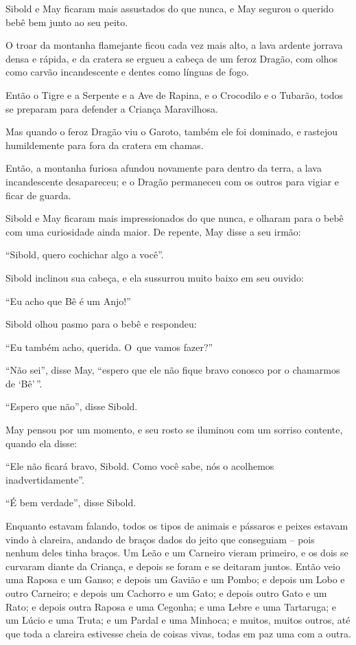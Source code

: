 Sibold e May ficaram mais assustados do que nunca, e May segurou o
querido bebê bem junto ao seu peito.

O troar da montanha flamejante ficou cada vez mais alto, a lava ardente
jorrava densa e rápida, e da cratera se ergueu a cabeça de um feroz
Dragão, com olhos como carvão incandescente e dentes como línguas de
fogo.

Então o Tigre e a Serpente e a Ave de Rapina, e o Crocodilo e o Tubarão,
todos se preparam para defender a Criança Maravilhosa.

Mas quando o feroz Dragão viu o Garoto, também ele foi dominado, e
rastejou humildemente para fora da cratera em chamas.

Então, a montanha furiosa afundou novamente para dentro da terra, a lava
incandescente desapareceu; e o Dragão permaneceu com os outros para
vigiar e ficar de guarda.

Sibold e May ficaram mais impressionados do que nunca, e olharam para o
bebê com uma curiosidade ainda maior. De repente, May disse a seu irmão:

``Sibold, quero cochichar algo a você''.

Sibold inclinou sua cabeça, e ela sussurrou muito baixo em seu ouvido:

``Eu acho que Bê é um Anjo!''

Sibold olhou pasmo para o bebê e respondeu:

``Eu também acho, querida. O~que vamos fazer?''

``Não sei'', disse May, ``espero que ele não fique bravo conosco por o
chamarmos de `Bê'\,''.

``Espero que não'', disse Sibold.

May pensou por um momento, e seu rosto se iluminou com um sorriso
contente, quando ela disse:

``Ele não ficará bravo, Sibold. Como você sabe, nós o acolhemos
inadvertidamente''.

``É bem verdade'', disse Sibold.

Enquanto estavam falando, todos os tipos de animais e pássaros e peixes
estavam vindo à clareira, andando de braços dados do jeito que
conseguiam -- pois nenhum deles tinha braços. Um Leão e um Carneiro
vieram primeiro, e os dois se curvaram diante da Criança, e depois se
foram e se deitaram juntos. Então veio uma Raposa e um Ganso; e depois
um Gavião e um Pombo; e depois um Lobo e outro Carneiro; e depois um
Cachorro e um Gato; e depois outro Gato e um Rato; e depois outra Raposa
e uma Cegonha; e uma Lebre e uma Tartaruga; e um Lúcio e uma Truta; e um
Pardal e uma Minhoca; e muitos, muitos outros, até que toda a clareira
estivesse cheia de coisas vivas, todas em paz uma com a outra.

